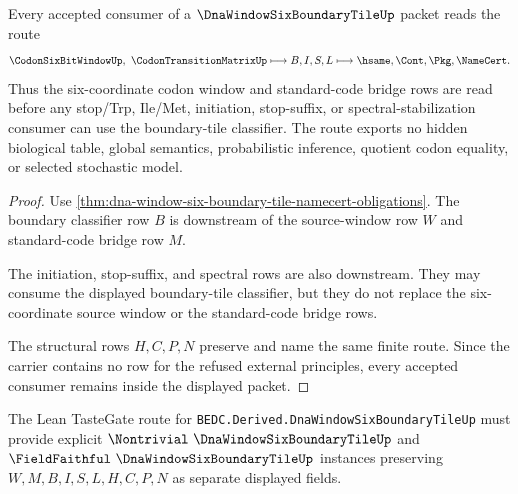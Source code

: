 \begin{theorem}
\label{thm:dna-window-six-boundary-tile-consumer-nonescape}
Every accepted consumer of a $\DnaWindowSixBoundaryTileUp$ packet reads the route
$$
\CodonSixBitWindowUp,\ \CodonTransitionMatrixUp \longmapsto B,I,S,L \longmapsto \hsame,\Cont,\Pkg,\NameCert .
$$
Thus the six-coordinate codon window and standard-code bridge rows are read before any stop/Trp, Ile/Met, initiation, stop-suffix, or spectral-stabilization consumer can use the boundary-tile classifier. The route exports no hidden biological table, global semantics, probabilistic inference, quotient codon equality, or selected stochastic model.
\end{theorem}
\begin{proof}
Use \autoref{thm:dna-window-six-boundary-tile-namecert-obligations}. The boundary classifier row $B$ is downstream of the source-window row $W$ and standard-code bridge row $M$.

The initiation, stop-suffix, and spectral rows are also downstream. They may consume the displayed boundary-tile classifier, but they do not replace the six-coordinate source window or the standard-code bridge rows.

The structural rows $H,C,P,N$ preserve and name the same finite route. Since the carrier contains no row for the refused external principles, every accepted consumer remains inside the displayed packet.
\end{proof}



The Lean TasteGate route for \texttt{BEDC.Derived.DnaWindowSixBoundaryTileUp} must provide explicit $\Nontrivial\ \DnaWindowSixBoundaryTileUp$ and $\FieldFaithful\ \DnaWindowSixBoundaryTileUp$ instances preserving $W,M,B,I,S,L,H,C,P,N$ as separate displayed fields.


